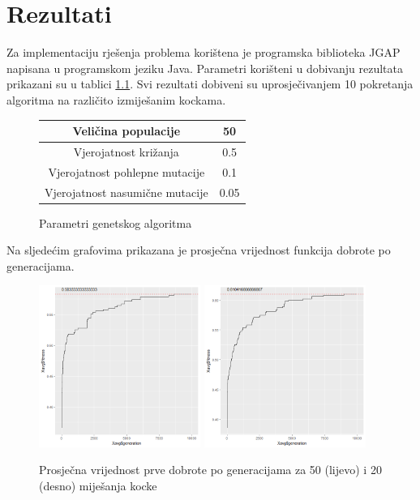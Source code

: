 \documentclass[times, utf8, seminar, numeric]{fer}
\begin{document}
\chapter{Rezultati}
Za implementaciju rješenja problema korištena je programska biblioteka JGAP\cite{jgap} napisana u programskom jeziku Java. Parametri korišteni u dobivanju rezultata prikazani su u tablici \ref{parameters}. Svi rezultati dobiveni su uprosječivanjem 10 pokretanja algoritma na različito izmiješanim kockama.

\begin{figure}[h]
\centering
\begin{tabular}{|c|c|}\hline
Veličina populacije & 50\\\hline
Vjerojatnost križanja & 0.5\\\hline
Vjerojatnost pohlepne mutacije & 0.1\\\hline
Vjerojatnost nasumične mutacije & 0.05\\\hline
\end{tabular}
\caption{Parametri genetskog algoritma}
\label{parameters}
\end{figure}

Na sljedećim grafovima prikazana je prosječna vrijednost funkcija dobrote po generacijama.

  		\begin{figure}[ht!]
			\centering
			\includegraphics[width=0.47\textwidth]{../results/sumsides_fitness/50_scrambles/cross0,5greedy10mut20.png}
			\includegraphics[width=0.47\textwidth]{../results/sumsides_fitness/20_scrambles/cross0,5greedy10mut20.png}
			\caption{Prosječna vrijednost prve dobrote po generacijama za 50 (lijevo) i 20 (desno) miješanja kocke }
		\end{figure}
		
\end{document}
